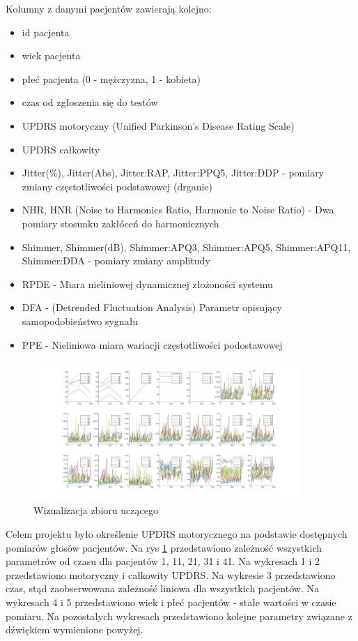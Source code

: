 \documentclass[12pt]{article}
\begin{document}
Kolumny z danymi pacjentów zawierają kolejno:
\begin{itemize}
	\item id pacjenta
	\item wiek pacjenta
	\item płeć pacjenta (0 - mężczyzna, 1 - kobieta)
	\item czas od zgłoszenia się do testów
	\item UPDRS motoryczny (Unified Parkinson's Disease Rating Scale)
	\item UPDRS całkowity
	\item Jitter(\%), Jitter(Abs), Jitter:RAP, Jitter:PPQ5, Jitter:DDP - pomiary zmiany częstotliwości podstawowej (drganie)
	\item NHR, HNR (Noise to Harmonics Ratio, Harmonic to Noise Ratio) -  Dwa pomiary stosunku zakłóceń do harmonicznych
	\item Shimmer, Shimmer(dB), Shimmer:APQ3, Shimmer:APQ5, Shimmer:APQ11, Shimmer:DDA - pomiary zmiany amplitudy
	\item RPDE - Miara nieliniowej dynamicznej złożoności systemu
	\item DFA - (Detrended Fluctuation Analysis) Parametr opisujący samopodobieństwo sygnału
	\item PPE - Nieliniowa miara wariacji częstotliwości podostawowej
\end{itemize}

\begin{figure}
\centering
	\includegraphics[width=0.90\textwidth]{data.jpg}\par\vspace{1cm}
\caption{Wizualizacja zbioru uczącego}
\label{data visualisation}
\end{figure}

Celem projektu było określenie UPDRS motorycznego na podstawie dostępnych pomiarów  głosów pacjentów. Na rys \ref{data visualisation} przedstawiono zależność wszystkich parametrów od czasu dla pacjentów 1, 11, 21, 31 i 41. Na wykresach 1 i 2 przedstawiono motoryczny i całkowity UPDRS. Na wykresie 3 przedstawiono czas, stąd zaobserwowana zależność liniowa dla wszystkich pacjentów. Na wykresach 4 i 5 przedstawiono wiek i płeć pacjentów - stałe wartości w czasie pomiaru. Na pozostałych wykresach przedstawiono kolejne parametry związane z dźwiękiem wymienione powyżej.
\end{document}

